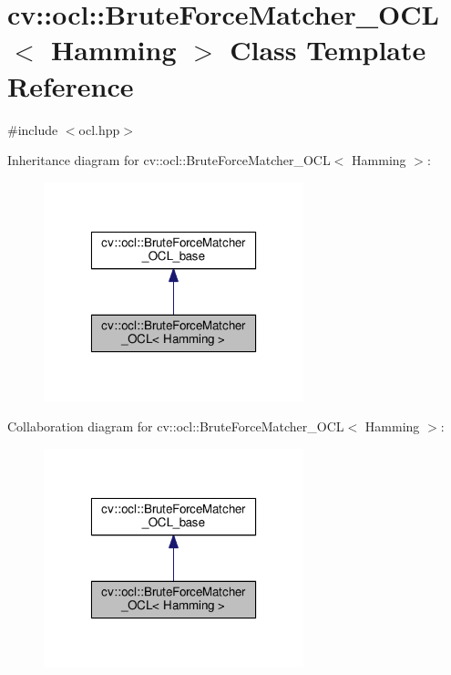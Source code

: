 \hypertarget{classcv_1_1ocl_1_1BruteForceMatcher__OCL_3_01Hamming_01_4}{\section{cv\-:\-:ocl\-:\-:Brute\-Force\-Matcher\-\_\-\-O\-C\-L$<$ Hamming $>$ Class Template Reference}
\label{classcv_1_1ocl_1_1BruteForceMatcher__OCL_3_01Hamming_01_4}
}


{\ttfamily \#include $<$ocl.\-hpp$>$}



Inheritance diagram for cv\-:\-:ocl\-:\-:Brute\-Force\-Matcher\-\_\-\-O\-C\-L$<$ Hamming $>$\-:\nopagebreak
\begin{figure}[H]
\begin{center}
\leavevmode
\includegraphics[width=214pt]{classcv_1_1ocl_1_1BruteForceMatcher__OCL_3_01Hamming_01_4__inherit__graph}
\end{center}
\end{figure}


Collaboration diagram for cv\-:\-:ocl\-:\-:Brute\-Force\-Matcher\-\_\-\-O\-C\-L$<$ Hamming $>$\-:\nopagebreak
\begin{figure}[H]
\begin{center}
\leavevmode
\includegraphics[width=214pt]{classcv_1_1ocl_1_1BruteForceMatcher__OCL_3_01Hamming_01_4__coll__graph}
\end{center}
\end{figure}
